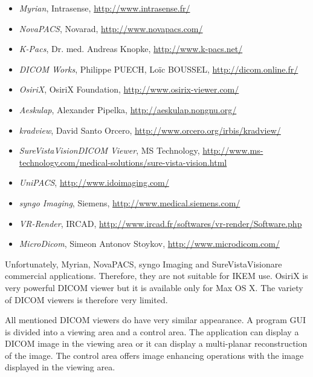 \begin{itemize}
  \setlength{\itemsep}{0pt}
  \setlength{\parskip}{0pt}
  \setlength{\parsep}{0pt}
\item \emph{Myrian}, Intrasense, \url{http://www.intrasense.fr/}
\item \emph{NovaPACS}, Novarad, \url{http://www.novapacs.com/}
\item \emph{K-Pacs}, Dr. med. Andreas Knopke, \url{http://www.k-pacs.net/}
\item \emph{DICOM Works}, Philippe PUECH, Loïc BOUSSEL, \url{http://dicom.online.fr/}
\item \emph{OsiriX}, OsiriX Foundation, \url{http://www.osirix-viewer.com/}
\item \emph{Aeskulap}, Alexander Pipelka, \url{http://aeskulap.nongnu.org/}
\item \emph{kradview}, David Santo Orcero, \url{http://www.orcero.org/irbis/kradview/}
\item \emph{SureVistaVision\texttrademark DICOM Viewer}, MS Technology, \url{http://www.ms-technology.com/medical-solutions/sure-vista-vision.html}
\item \emph{UniPACS},  \url{http://www.idoimaging.com/}
\item \emph{syngo Imaging}, Siemens, \url{http://www.medical.siemens.com/}
\item \emph{VR-Render}, IRCAD, \url{http://www.ircad.fr/softwares/vr-render/Software.php}
\item \emph{MicroDicom}, Simeon Antonov Stoykov, \url{http://www.microdicom.com/}
\end{itemize}

Unfortunately, Myrian, NovaPACS, syngo Imaging and SureVistaVision\texttrademark are commercial applications. Therefore, they are not suitable for IKEM use. OsiriX is very powerful DICOM viewer but it is available only for Max OS X. The variety of DICOM viewers is therefore very limited.

All mentioned DICOM viewers do have very similar appearance. A program GUI is divided into a viewing area and a control area. The application can display a DICOM image in the viewing area or it can display a multi-planar reconstruction of the image. The control area offers image enhancing operations with the image displayed in the viewing area.

